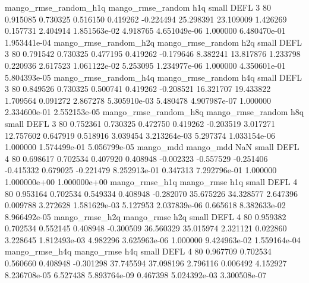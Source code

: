 mango_rmse_random_h1q mango_rmse_random                  h1q      small     DEFL                 3 80 0.915085       0.730325 0.516150       0.419262   -0.224494     25.298391     23.109009     1.426269       0.157731  2.404914 1.851563e-02     4.918765   4.651049e-06            1.000000    6.480470e-01        1.953441e-04
mango_rmse_random_h2q mango_rmse_random                  h2q      small     DEFL                 3 80 0.791542       0.730325 0.477195       0.419262   -0.179646      8.382241     13.817876     1.233798       0.220936  2.617523 1.061122e-02     5.253095   1.234977e-06            1.000000    4.350601e-01        5.804393e-05
mango_rmse_random_h4q mango_rmse_random                  h4q      small     DEFL                 3 80 0.849526       0.730325 0.500741       0.419262   -0.208521     16.321707     19.433822     1.709564       0.091272  2.867278 5.305910e-03     5.480478   4.907987e-07            1.000000    2.334600e-01        2.552153e-05
mango_rmse_random_h8q mango_rmse_random                  h8q      small     DEFL                 3 80 0.752361       0.730325 0.472750       0.419262   -0.203519      3.017271     12.757602     0.647919       0.518916  3.039454 3.213264e-03     5.297374   1.033154e-06            1.000000    1.574499e-01        5.056799e-05
            mango_mdd         mango_mdd                  NaN      small     DEFL                 4 80 0.698617       0.702534 0.407920       0.408948   -0.002323     -0.557529     -0.251406    -0.415332       0.679025 -0.221479 8.252913e-01     0.347313   7.292796e-01            1.000000    1.000000e+00        1.000000e+00
       mango_rmse_h1q        mango_rmse                  h1q      small     DEFL                 4 80 0.953164       0.702534 0.549334       0.408948   -0.282070     35.675226     34.328577     2.647396       0.009788  3.272628 1.581629e-03     5.127953   2.037839e-06            0.665618    8.382633e-02        8.966492e-05
       mango_rmse_h2q        mango_rmse                  h2q      small     DEFL                 4 80 0.959382       0.702534 0.552145       0.408948   -0.300509     36.560329     35.015974     2.321121       0.022860  3.228645 1.812493e-03     4.982296   3.625963e-06            1.000000    9.424963e-02        1.559164e-04
       mango_rmse_h4q        mango_rmse                  h4q      small     DEFL                 4 80 0.967709       0.702534 0.560660       0.408948   -0.301298     37.745594     37.098196     2.796116       0.006492  4.152927 8.236708e-05     6.527438   5.893764e-09            0.467398    5.024392e-03        3.300508e-07

